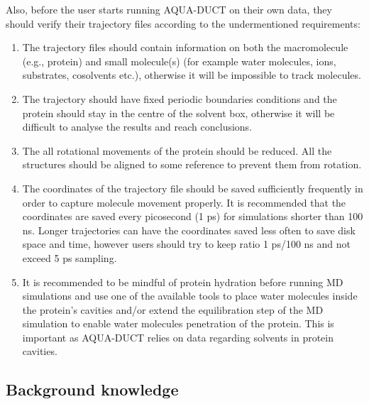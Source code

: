 \documentclass[9pt,tutorial, pubversion]{livecoms}
\begin{document}
Also, before the user starts running AQUA-DUCT on their own data, they should verify their trajectory files according to the undermentioned requirements:
\begin{enumerate}
\item The trajectory files should contain information on both the macromolecule (e.g., protein) and small molecule(s) (for example water molecules, ions, substrates, cosolvents etc.), otherwise it will be impossible to track molecules.
\item The trajectory should have fixed periodic boundaries conditions and the protein should stay in the centre of the solvent box, otherwise it will be difficult to analyse the results and reach conclusions.
\item The all rotational movements of the protein should be reduced. All the structures should be aligned to some reference to prevent them from rotation.
\item The coordinates of the trajectory file should be saved sufficiently frequently in order to capture molecule movement properly. It is recommended that the coordinates are saved every picosecond (1 ps) for simulations shorter than 100 ns. Longer trajectories can have the coordinates saved less often to save disk space and time, however users should try to keep ratio 1 ps/100 ns and not exceed 5 ps sampling.
\item It is recommended to be mindful of protein hydration before running MD simulations and use one of the available tools \cite{Mitusinska2020} to place water molecules inside the protein’s cavities and/or extend the equilibration step of the MD simulation to enable water molecules penetration of the protein. This is important as AQUA-DUCT relies on data regarding solvents in protein cavities. 
\end{enumerate}

\subsection{Background knowledge}
\end{document}
